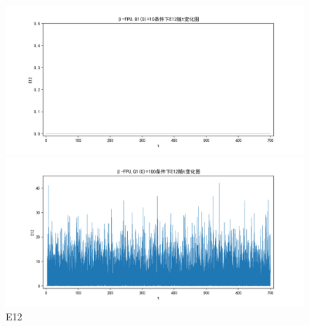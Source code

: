 \documentclass[10pt, a4paper]{article}
\begin{document}
    \begin{figure}[H]
        \begin{minipage}[t]{0.49\textwidth}
            \centering
            \includegraphics[width=\textwidth]{./q6_pics/cmp/E12.png}
        \end{minipage}
        \begin{minipage}[t]{0.49\textwidth}
            \centering
            \includegraphics[width=\textwidth]{./q6_pics/exp/E12.png}
        \end{minipage}
        \caption{E12}\label{fig:E12 in q6}
    \end{figure}
\end{document}
